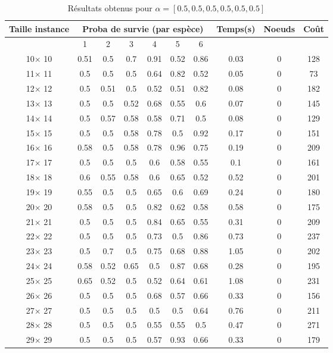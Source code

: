 \documentclass[main.tex]{subfiles}
\begin{document}
\begin{table}
    \centering
    \caption{Résultats obtenus pour $\alpha = [0.5, 0.5, 0.5, 0.5, 0.5, 0.5]$}
    \begin{tabular}{|c|c|c|c|c|c|c|c|c|c|}
	\hline
	\textbf{Taille instance} &\multicolumn{6}{c}{\textbf{Proba de survie (par espèce)}} &\textbf{Temps(s)} &\textbf{Noeuds} &\textbf{Coût}\\
	\hline
	 &1 &2 &3 &4 &5 &6 & & &\\
	\hline

10$\times$ 10 &0.51 &0.5 &0.7 &0.91 &0.52 &0.86 &0.03 &0 &128\\
11$\times$ 11 &0.5 &0.5 &0.5 &0.64 &0.82 &0.52 &0.05 &0 &73\\
12$\times$ 12 &0.5 &0.51 &0.5 &0.52 &0.51 &0.82 &0.08 &0 &182\\
13$\times$ 13 &0.5 &0.5 &0.52 &0.68 &0.55 &0.6 &0.07 &0 &145\\
14$\times$ 14 &0.5 &0.57 &0.58 &0.58 &0.71 &0.5 &0.08 &0 &129\\
15$\times$ 15 &0.5 &0.5 &0.58 &0.78 &0.5 &0.92 &0.17 &0 &151\\
16$\times$ 16 &0.58 &0.5 &0.58 &0.78 &0.96 &0.75 &0.19 &0 &209\\
17$\times$ 17 &0.5 &0.5 &0.5 &0.6 &0.58 &0.55 &0.1 &0 &161\\
18$\times$ 18 &0.6 &0.55 &0.58 &0.6 &0.65 &0.52 &0.52 &0 &201\\
19$\times$ 19 &0.55 &0.5 &0.5 &0.65 &0.6 &0.69 &0.24 &0 &180\\
20$\times$ 20 &0.58 &0.5 &0.5 &0.82 &0.62 &0.58 &0.58 &0 &175\\
21$\times$ 21 &0.5 &0.5 &0.5 &0.84 &0.65 &0.55 &0.31 &0 &209\\
22$\times$ 22 &0.5 &0.5 &0.5 &0.73 &0.5 &0.86 &0.73 &0 &237\\
23$\times$ 23 &0.5 &0.7 &0.5 &0.75 &0.68 &0.88 &1.05 &0 &202\\
24$\times$ 24 &0.58 &0.52 &0.65 &0.5 &0.87 &0.68 &0.28 &0 &195\\
25$\times$ 25 &0.65 &0.52 &0.5 &0.52 &0.64 &0.61 &1.08 &0 &231\\
26$\times$ 26 &0.5 &0.5 &0.5 &0.68 &0.57 &0.66 &0.33 &0 &156\\
27$\times$ 27 &0.5 &0.5 &0.5 &0.5 &0.5 &0.64 &0.76 &0 &211\\
28$\times$ 28 &0.5 &0.5 &0.5 &0.55 &0.55 &0.5 &0.47 &0 &271\\
29$\times$ 29 &0.5 &0.5 &0.5 &0.57 &0.93 &0.66 &0.33 &0 &179\\

\end{tabular}
\end{table}
\end{document}
